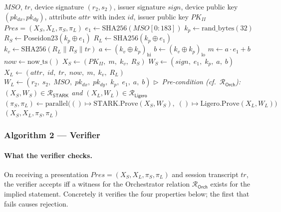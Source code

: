 \documentclass{article}
\newcommand{\concat}{\mathbin{\|}}
\newcommand{\hipart}[1]{{#1}_{\mathrm{hi}}}
\newcommand{\lopart}[1]{{#1}_{\mathrm{lo}}}
\newcommand{\SHA}{\mathrm{SHA256}}
\newcommand{\Poseidon}{\mathrm{Poseidon23}}
\newcommand{\prand}{\mathrm{rand\_bytes}}
\newcommand{\nowts}{\mathrm{now\_ts}}
\newcommand{\STARKProve}{\mathrm{STARK.Prove}}
\newcommand{\LigeroProve}{\mathrm{Ligero.Prove}}
\newcommand{\Rel}[1]{\mathcal{R}_{#1}}
\newcommand{\RelSTARK}{\Rel{\mathsf{STARK}}}
\newcommand{\RelLigero}{\Rel{\mathsf{Ligero}}}
\newcommand{\RelOrch}{\Rel{\mathsf{Orch}}}
\begin{document}
\begin{algorithm}[H]
\caption{Orchestrator (prover for $\RelOrch$)}
\label{alg:orchestrator}
\begin{algorithmic}[1]
\Require $MSO$,\; $tr$,\; device signature $(r_2, s_2)$,\; issuer signature $sign$,\;
         device public key $(pk_{dx}, pk_{dy})$,\;
         attribute $attr$ with index $id$,\; issuer public key $PK_{II}$
\Ensure  $Pres = (X_S, X_L, \pi_S, \pi_L)$
\State $e_1 \gets \SHA(MSO[0:183])$
\State $k_p \gets \prand(32)$
\State
\State $R_S \gets \Poseidon(k_p \oplus e_1)$
\State $R_L \gets \SHA(k_p \oplus e_1)$
\State $k_v \gets \SHA(R_L \concat R_S \concat tr)$
\State
\State $a \gets \hipart{(k_v \oplus k_p)}$
\State $b \gets \lopart{(k_v \oplus k_p)}$
\State $m \gets a \cdot e_1 + b$
\State
\State $now \gets \nowts()$
\State
\State $X_S \gets (PK_{II},\; m,\; k_v,\; R_S)$
\State $W_S \gets (sign,\; e_1,\; k_p,\; a,\; b)$
\State $X_L \gets (attr,\; id,\; tr,\; now,\; m,\; k_v,\; R_L)$
\State $W_L \gets (r_2,\; s_2,\; MSO,\; pk_{dx},\; pk_{dy},\; k_p,\; e_1,\; a,\; b)$
\State
\State \(\triangleright\)~\textit{Pre-condition (cf.\ $\RelOrch$): $(X_S,W_S)\in\RelSTARK$ and
       $(X_L,W_L)\in\RelLigero$}
\State $(\pi_S, \pi_L) \gets
  \mathrm{parallel}\!\bigl(
    ()\mapsto\STARKProve(X_S,W_S),\;
    ()\mapsto\LigeroProve(X_L,W_L)
  \bigr)$
\State \Return $(X_S, X_L, \pi_S, \pi_L)$
\end{algorithmic}
\end{algorithm}

\subsubsection{Algorithm 2 --- Verifier}
\label{sec:verifier}

\paragraph{What the verifier checks.}
On receiving a presentation $Pres = (X_S, X_L, \pi_S, \pi_L)$ and session
transcript $tr$, the verifier accepts iff a witness for the Orchestrator
relation $\RelOrch$ exists for the implied statement. Concretely it verifies
the four properties below; the first that fails causes rejection.
\end{document}
